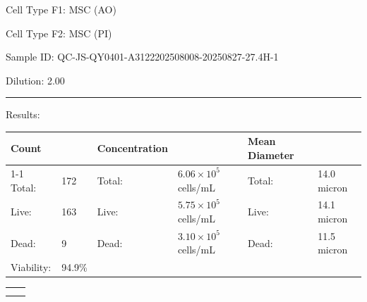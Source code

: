 \documentclass[UTF8,10pt,a4paper,fontset=fandol]{ctexart}
\newcommand{\fieldvalue}[1]{#1}
\begin{document}
Cell Type F1: 
\fieldvalue{MSC (AO)}

Cell Type F2: 
\fieldvalue{MSC (PI)}

Sample ID: 
\fieldvalue{QC-JS-QY0401-A3122202508008-20250827-27.4H-1}

Dilution: 
\fieldvalue{2.00}

\noindent\rule{\textwidth}{0.4pt}

Results:

\begin{tabularx}{\textwidth}{@{}lXlXlX@{}}
\textbf{Count} & & \textbf{Concentration} & & \textbf{Mean Diameter} & \\
\cline{1-1}\cline{3-3}\cline{5-5}
Total: &
\fieldvalue{172}
&
Total: &
\fieldvalue{$6.06\times10^{5}$ cells/mL}
&
Total: &
\fieldvalue{14.0 micron}
\\
Live: &
\fieldvalue{163}
&
Live: &
\fieldvalue{$5.75\times10^{5}$ cells/mL}
&
Live: &
\fieldvalue{14.1 micron}
\\
Dead: &
\fieldvalue{9}
&
Dead: &
\fieldvalue{$3.10\times10^{5}$ cells/mL}
&
Dead: &
\fieldvalue{11.5 micron}
\\
Viability: &
\fieldvalue{94.9\%}
&
&
&
&
\\
\end{tabularx}

\vspace{1em}

\begin{center}
\begin{tabular}{cc}
\fbox{\parbox[c][4.2cm][c]{0.38\textwidth}{\centering
}} &
\fbox{\parbox[c][4.2cm][c]{0.38\textwidth}{\centering
}} \\[1em]
\fbox{\parbox[c][4.2cm][c]{0.38\textwidth}{\centering
}} &
\fbox{\parbox[c][4.2cm][c]{0.38\textwidth}{\centering
}}
\end{tabular}
\end{center}
\end{document}
